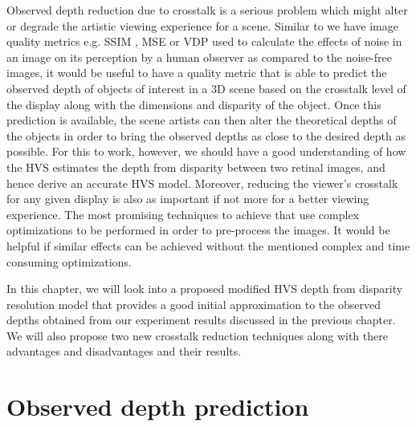 Observed depth reduction due to crosstalk is a serious problem which might alter or degrade the artistic viewing experience for a scene. Similar to we have image quality metrics e.g. SSIM \cite{wang2004image}, MSE\cite{ wiki:MSE} or VDP\cite{mantiuk2004visible} used to calculate the effects of noise in an image on its perception by a human observer as compared to the noise-free images, it would be useful to have a quality metric that is able to predict the observed depth of objects of interest in a 3D scene based on the crosstalk level of the display along with the dimensions and disparity of the object. Once this prediction is available, the scene artists can then alter the theoretical depths of the objects in order to bring the observed depths as close to the desired depth as possible. For this to work, however, we should have a good understanding of how the HVS estimates the depth from disparity between two retinal images, and hence derive an accurate HVS model. Moreover, reducing the viewer's crosstalk for any given display is also as important if not more for a better viewing experience. The most promising techniques to achieve that use complex optimizations to be performed in order to pre-process the images\cite{van2011perceptually}. It would be helpful if similar effects can be achieved without the mentioned complex and time consuming optimizations.

In this chapter, we will look into a proposed modified HVS depth from disparity resolution model that provides a good initial approximation to the observed depths obtained from our experiment results discussed in the previous chapter. We will also propose two new crosstalk reduction techniques along with there advantages and disadvantages and their results.

\section{Observed depth prediction}

